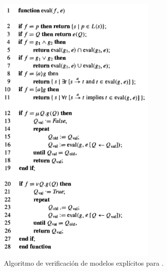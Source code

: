 \begin{figure}[h!]
  \centering
  \includegraphics[width=0.7\textwidth]{Figures/eval.png}
  \caption{Algoritmo de verificación de modelos explícitos para {\mucalculo}.} 
  \label{fig:eval1}
\end{figure}
